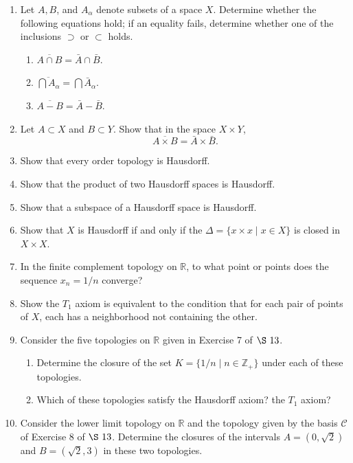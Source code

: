 \begin{enumerate}[itemsep=0.4em, parsep=0pt, topsep=0pt, partopsep=0pt, leftmargin=*, label=\arabic*., ref=\arabic*]
\item Let \(A,B\), and \(A_{\alpha }\) denote subsets of a space \(X\). Determine whether the following equations hold; if an equality fails, determine whether one of the inclusions \(\supset\) or \(\subset\) holds.
  \begin{enumerate}[itemsep=0.2em, parsep=0pt, topsep=0pt, partopsep=0pt, leftmargin=*, label=(\alph*), align=left]
  \item \(\overline{A \cap B} = \bar{A} \cap \bar{B}\).
  \item \(\overline{\bigcap {A}_{\alpha }} = \bigcap {\bar{A}}_{\alpha }\).
  \item \(\overline{A - B} = \bar{A} - \bar{B}\).
  \end{enumerate}
\item Let \(A \subset X\) and \(B \subset Y\). Show that in the space \(X \times Y\), \[ \overline{A \times B} = \bar{A} \times \bar{B}. \]
\item Show that every order topology is Hausdorff.
\item Show that the product of two Hausdorff spaces is Hausdorff.
\item Show that a subspace of a Hausdorff space is Hausdorff.
\item Show that \(X\) is Hausdorff if and only if the \(\Delta = \{ x \times x \mid x \in X\}\) is closed in \(X \times X\).
\item In the finite complement topology on \(\mathbb{R}\), to what point or points does the sequence \(x_{n} = 1/n\) converge?
\item Show the \(T_{1}\) axiom is equivalent to the condition that for each pair of points of \(X\), each has a neighborhood not containing the other.
\item Consider the five topologies on \(\mathbb{R}\) given in Exercise 7 of \(\S\ {13}\).
  \begin{enumerate}[itemsep=0.2em, parsep=0pt, topsep=0pt, partopsep=0pt, leftmargin=*, label=(\alph*), align=left]
  \item Determine the closure of the set \(K = \{ {1/n \mid n \in {\mathbb{Z}}_{ + }}\}\) under each of these topologies.
  \item Which of these topologies satisfy the Hausdorff axiom? the \(T_{1}\) axiom?
  \end{enumerate}
\item Consider the lower limit topology on \(\mathbb{R}\) and the topology given by the basis \(\mathcal{C}\) of Exercise 8 of \(\S\ {13}\). Determine the closures of the intervals \(A = ( {0,\sqrt{2}})\) and \(B = ( {\sqrt{2},3})\) in these two topologies.

\end{enumerate}
